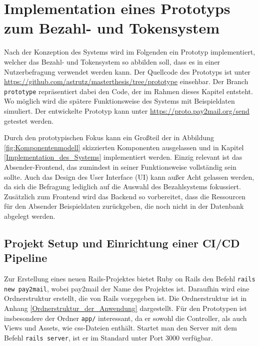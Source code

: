 
\chapter{Implementation eines Prototyps zum Bezahl- und Tokensystem}
\label{Implementation_eines_Prototyps_zum Bezahl-_und_Tokensystem}

Nach der Konzeption des Systems wird im Folgenden ein Prototyp implementiert, welcher das Bezahl- und Tokensystem so abbilden soll, dass es in einer Nutzerbefragung verwendet werden kann.  Der Quellcode des Prototyps ist unter \url{https://github.com/astrutz/masterthesis/tree/prototype} einsehbar. Der Branch \texttt{prototype} repräsentiert dabei den Code, der im Rahmen dieses Kapitel entsteht.
 Wo möglich wird die spätere Funktionsweise des Systems mit Beispieldaten simuliert. Der entwickelte Prototyp kann unter \url{https://proto.pay2mail.org/send} getestet werden. 
 
Durch den prototypischen Fokus kann ein Großteil der in Abbildung \ref{fig:Komponentenmodell} skizzierten Komponenten ausgelassen und in Kapitel \ref{Implementation_des_Systems} implementiert werden. Einzig relevant ist das Absender-Frontend, das zumindest in seiner Funktionsweise vollständig sein sollte. Auch das Design des User Interface (UI) kann außer Acht gelassen werden, da sich die Befragung lediglich auf die Auswahl des Bezahlsystems fokussiert. Zusätzlich zum Frontend wird das Backend so vorbereitet, dass die Ressourcen für den Absender Beispieldaten zurückgeben, die noch nicht in der Datenbank abgelegt werden. 

\section{Projekt Setup und Einrichtung einer CI/CD Pipeline}
\label{Projekt_Setup_und_Einrichtung_einer_CI/CD Pipeline}

Zur Erstellung eines neuen Rails-Projektes bietet Ruby on Rails den Befehl \texttt{rails new pay2mail}, wobei pay2mail der Name des Projektes ist. Daraufhin wird eine Ordnerstruktur erstellt, die von Rails vorgegeben ist. Die Ordnerstruktur ist in Anhang \ref{Ordnerstruktur_der_Anwendung} dargestellt. Für den Prototypen ist insbesondere der Ordner \texttt{app/} interessant, da er sowohl die Controller, als auch Views und Assets, wie css-Dateien enthält. Startet man den Server mit dem Befehl \texttt{rails server}, ist er im Standard unter Port 3000 verfügbar.

